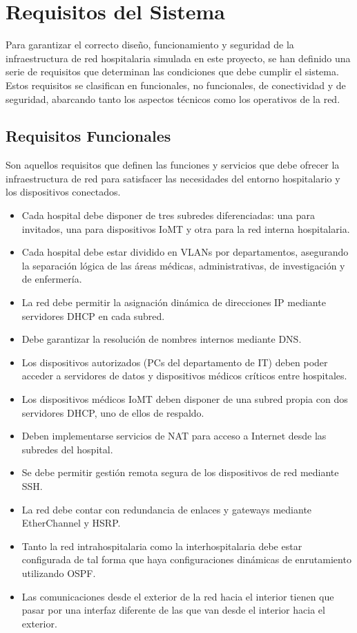 \section{Requisitos del Sistema}
Para garantizar el correcto diseño, funcionamiento y seguridad de la infraestructura de red hospitalaria simulada en este proyecto, se han definido una serie de requisitos 
que determinan las condiciones que debe cumplir el sistema. Estos requisitos se clasifican en funcionales, no funcionales, de conectividad y de seguridad, abarcando tanto 
los aspectos técnicos como los operativos de la red.

\subsection{Requisitos Funcionales}
Son aquellos requisitos que definen las funciones y servicios que debe ofrecer la infraestructura de red para satisfacer las necesidades del entorno hospitalario y los 
dispositivos conectados.
\begin{itemize}
    \item Cada hospital debe disponer de tres subredes diferenciadas: una para invitados, una para dispositivos IoMT y otra para la red interna hospitalaria.
    \item Cada hospital debe estar dividido en VLANs por departamentos, asegurando la separación lógica de las áreas médicas, administrativas, de investigación y de enfermería.
    \item La red debe permitir la asignación dinámica de direcciones IP mediante servidores DHCP en cada subred.
    \item Debe garantizar la resolución de nombres internos mediante DNS.
    \item Los dispositivos autorizados (PCs del departamento de IT) deben poder acceder a servidores de datos y dispositivos médicos críticos entre hospitales.
    \item Los dispositivos médicos IoMT deben disponer de una subred propia con dos servidores DHCP, uno de ellos de respaldo.
    \item Deben implementarse servicios de NAT para acceso a Internet desde las subredes del hospital.
    \item Se debe permitir gestión remota segura de los dispositivos de red mediante SSH.
    \item La red debe contar con redundancia de enlaces y gateways mediante EtherChannel y HSRP.
    \item Tanto la red intrahospitalaria como la interhospitalaria debe estar configurada de tal forma que haya configuraciones dinámicas de enrutamiento utilizando OSPF.
    \item Las comunicaciones desde el exterior de la red hacia el interior tienen que pasar por una interfaz diferente de las que van desde el interior hacia el exterior.
\end{itemize}
